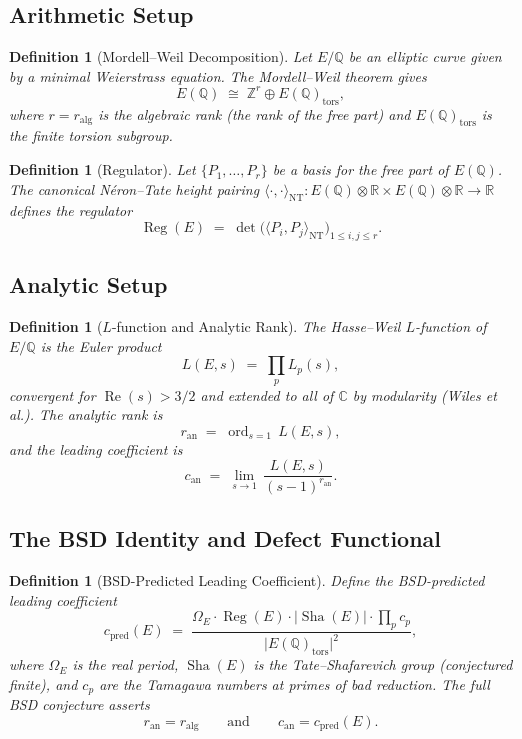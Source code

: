 \documentclass[11pt]{article}
\newtheorem{definition}[theorem]{Definition}
\DeclareMathOperator{\ord}{ord}
\DeclareMathOperator{\Reg}{Reg}
\DeclareMathOperator{\Sha}{Sha}
\begin{document}
\subsection{Arithmetic Setup}

\begin{definition}[Mordell--Weil Decomposition]
\label{def:mw-decomp}
Let $E/\mathbb{Q}$ be an elliptic curve given by a minimal Weierstrass equation.
The Mordell--Weil theorem gives
\[
  E(\mathbb{Q}) \;\cong\; \mathbb{Z}^{r} \oplus E(\mathbb{Q})_{\mathrm{tors}},
\]
where $r = r_{\mathrm{alg}}$ is the \emph{algebraic rank} (the rank of the free
part) and $E(\mathbb{Q})_{\mathrm{tors}}$ is the finite torsion subgroup.
\end{definition}

\begin{definition}[Regulator]
\label{def:regulator}
Let $\{P_1, \ldots, P_r\}$ be a basis for the free part of $E(\mathbb{Q})$.
The canonical N\'{e}ron--Tate height pairing
$\langle \cdot, \cdot \rangle_{\mathrm{NT}} \colon E(\mathbb{Q}) \otimes
\mathbb{R} \times E(\mathbb{Q}) \otimes \mathbb{R} \to \mathbb{R}$
defines the \emph{regulator}
\[
  \Reg(E) \;=\; \det\!\bigl(\langle P_i, P_j \rangle_{\mathrm{NT}}\bigr)_{1 \le i,j \le r}.
\]
\end{definition}

\subsection{Analytic Setup}

\begin{definition}[$L$-function and Analytic Rank]
\label{def:L-func}
The Hasse--Weil $L$-function of $E/\mathbb{Q}$ is the Euler product
\[
  L(E, s) \;=\; \prod_{p} L_p(s),
\]
convergent for $\operatorname{Re}(s) > 3/2$ and extended to all of $\mathbb{C}$
by modularity (Wiles et al.).  The \emph{analytic rank} is
\[
  r_{\mathrm{an}} \;=\; \ord_{s=1}\, L(E, s),
\]
and the \emph{leading coefficient} is
\[
  c_{\mathrm{an}} \;=\; \lim_{s \to 1}\,
    \frac{L(E, s)}{(s - 1)^{r_{\mathrm{an}}}}.
\]
\end{definition}

\subsection{The BSD Identity and Defect Functional}

\begin{definition}[BSD-Predicted Leading Coefficient]
\label{def:bsd-pred}
Define the \emph{BSD-predicted leading coefficient}
\[
  c_{\mathrm{pred}}(E) \;=\;
    \frac{\Omega_E \cdot \Reg(E) \cdot |\Sha(E)| \cdot \displaystyle\prod_p c_p}
         {\bigl|E(\mathbb{Q})_{\mathrm{tors}}\bigr|^2},
\]
where $\Omega_E$ is the real period, $\Sha(E)$ is the Tate--Shafarevich group
(conjectured finite), and $c_p$ are the Tamagawa numbers at primes of bad
reduction.  The full BSD conjecture asserts
\[
  r_{\mathrm{an}} = r_{\mathrm{alg}}
  \qquad\text{and}\qquad
  c_{\mathrm{an}} = c_{\mathrm{pred}}(E).
\]
\end{definition}
\end{document}

